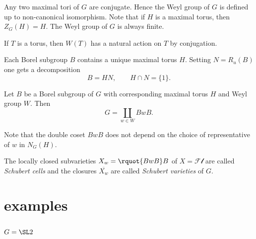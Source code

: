 \documentclass[english, no-theorem-numbers]{short-notes}
\begin{document}
Any two maximal tori of $G$ are conjugate.
Hence the Weyl group of $G$ is defined up to non-canonical isomorphism.
Note that if $H$ is a maximal torus, then $Z_G(H) = H$.
The Weyl group of $G$ is always finite.

If $T$ is a torus, then $W(T)$ has a natural action on $T$ by conjugation.

Each Borel subgroup $B$ contains a unique maximal torus $H$.
Setting $N = R_u(B)$ one gets a decomposition
\[
    B = HN, \qquad H∩N = \{1\}.
\]

\begin{Thm}
    Let $B$ be a Borel subgroup of $G$ with corresponding maximal torus $H$ and Weyl group $W$.
    Then
    \[
        G = \coprod_{w ∈ W} BwB.
    \]
\end{Thm}

Note that the double coset $BwB$ does not depend on the choice of representative of $w$ in $N_G(H)$.

\begin{Def}
    The locally closed subvarieties $X_w = \rquot{BwB}B$ of $X = \mathcal{Fl}$ are called \emph{Schubert cells} and the closures $\overline{X_w}$ are called \emph{Schubert varieties} of $G$.
\end{Def}

\section*{examples}

\subsection*{\texorpdfstring{$G = \SL2$}{G = SL2}}
\end{document}
